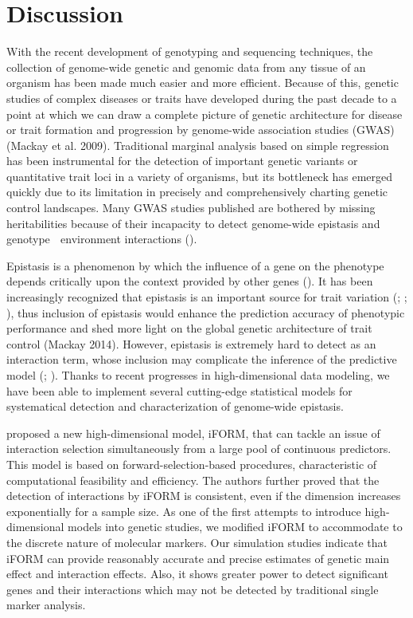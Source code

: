 \documentclass[11pt,]{book}
\theoremstyle{definition}
\theoremstyle{definition}
\theoremstyle{remark}
\begin{document}
\section{Discussion}\label{discussion}

With the recent development of genotyping and sequencing techniques, the
collection of genome-wide genetic and genomic data from any tissue of an
organism has been made much easier and more efficient. Because of this,
genetic studies of complex diseases or traits have developed during the
past decade to a point at which we can draw a complete picture of
genetic architecture for disease or trait formation and progression by
genome-wide association studies (GWAS) (Mackay et al. 2009). Traditional
marginal analysis based on simple regression has been instrumental for
the detection of important genetic variants or quantitative trait loci
in a variety of organisms, but its bottleneck has emerged quickly due to
its limitation in precisely and comprehensively charting genetic control
landscapes. Many GWAS studies published are bothered by missing
heritabilities because of their incapacity to detect genome-wide
epistasis and genotype  environment interactions
(\cite{manolio2009finding}).

Epistasis is a phenomenon by which the influence of a gene on the
phenotype depends critically upon the context provided by other genes
(\cite{cheverud1995epistasis}). It has been increasingly recognized that
epistasis is an important source for trait variation
(\cite{moore2003ubiquitous}; \cite{carlborg2004epistasis};
\cite{cordell2009detecting}), thus inclusion of epistasis would enhance
the prediction accuracy of phenotypic performance and shed more light on
the global genetic architecture of trait control (Mackay 2014). However,
epistasis is extremely hard to detect as an interaction term, whose
inclusion may complicate the inference of the predictive model
(\cite{carlborg2004epistasis}; \cite{mackay2014epistasis}). Thanks to
recent progresses in high-dimensional data modeling, we have been able
to implement several cutting-edge statistical models for systematical
detection and characterization of genome-wide epistasis.

\cite{hao2014interaction} proposed a new high-dimensional model, iFORM,
that can tackle an issue of interaction selection simultaneously from a
large pool of continuous predictors. This model is based on
forward-selection-based procedures, characteristic of computational
feasibility and efficiency. The authors further proved that the
detection of interactions by iFORM is consistent, even if the dimension
increases exponentially for a sample size. As one of the first attempts
to introduce high-dimensional models into genetic studies, we modified
iFORM to accommodate to the discrete nature of molecular markers. Our
simulation studies indicate that iFORM can provide reasonably accurate
and precise estimates of genetic main effect and interaction effects.
Also, it shows greater power to detect significant genes and their
interactions which may not be detected by traditional single marker
analysis.
\end{document}
